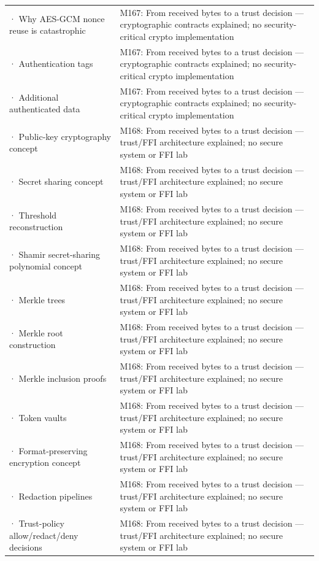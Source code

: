 {\begin{longtable}[]{@{}
  >{\raggedright\arraybackslash}p{}
  >{\raggedright\arraybackslash}p{}@{}}
2782 · Why AES-GCM nonce reuse is catastrophic & M167: From received bytes to a trust decision --- cryptographic contracts explained; no security-critical crypto implementation \\
2783 · Authentication tags & M167: From received bytes to a trust decision --- cryptographic contracts explained; no security-critical crypto implementation \\
2784 · Additional authenticated data & M167: From received bytes to a trust decision --- cryptographic contracts explained; no security-critical crypto implementation \\
2785 · Public-key cryptography concept & M168: From received bytes to a trust decision --- trust/FFI architecture explained; no secure system or FFI lab \\
2786 · Secret sharing concept & M168: From received bytes to a trust decision --- trust/FFI architecture explained; no secure system or FFI lab \\
2787 · Threshold reconstruction & M168: From received bytes to a trust decision --- trust/FFI architecture explained; no secure system or FFI lab \\
2788 · Shamir secret-sharing polynomial concept & M168: From received bytes to a trust decision --- trust/FFI architecture explained; no secure system or FFI lab \\
2789 · Merkle trees & M168: From received bytes to a trust decision --- trust/FFI architecture explained; no secure system or FFI lab \\
2790 · Merkle root construction & M168: From received bytes to a trust decision --- trust/FFI architecture explained; no secure system or FFI lab \\
2791 · Merkle inclusion proofs & M168: From received bytes to a trust decision --- trust/FFI architecture explained; no secure system or FFI lab \\
2792 · Token vaults & M168: From received bytes to a trust decision --- trust/FFI architecture explained; no secure system or FFI lab \\
2793 · Format-preserving encryption concept & M168: From received bytes to a trust decision --- trust/FFI architecture explained; no secure system or FFI lab \\
2794 · Redaction pipelines & M168: From received bytes to a trust decision --- trust/FFI architecture explained; no secure system or FFI lab \\
2795 · Trust-policy allow/redact/deny decisions & M168: From received bytes to a trust decision --- trust/FFI architecture explained; no secure system or FFI lab \\

\end{longtable}}
